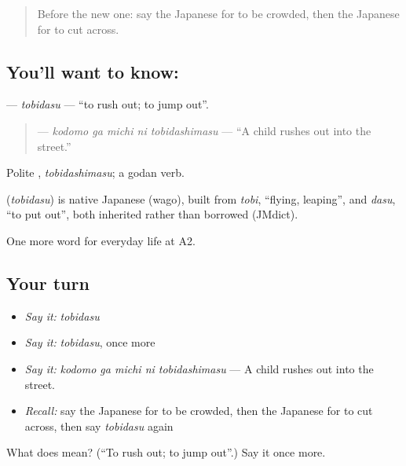 \begin{quote}
Before the new one: say the Japanese for to be crowded, then the Japanese for to cut across.
\end{quote}

\subsection*{You'll want to know: }
\textbf{} — \emph{tobidasu} — \textquotedblleft{}to rush out; to jump out\textquotedblright{}.

\begin{quote}
\textbf{  } — \emph{kodomo ga michi ni tobidashimasu} — \textquotedblleft{}A child rushes out into the street.\textquotedblright{}
\end{quote}

Polite \textbf{}, \emph{tobidashimasu}; a godan verb.

\begin{cousinweb}
\textbf{} (\emph{tobidasu}) is native Japanese (wago), built from \emph{tobi}, \textquotedblleft{}flying, leaping\textquotedblright{}, and \emph{dasu}, \textquotedblleft{}to put out\textquotedblright{}, both inherited rather than borrowed (JMdict).
\end{cousinweb}

\begin{grammarlens}[title={What you've built}]
One more word for everyday life at A2.
\end{grammarlens}

\subsection*{Your turn}
\begin{itemize}
\raggedright
  \item \emph{Say it:} \emph{tobidasu}
  \item \emph{Say it:} \emph{tobidasu}, once more
  \item \emph{Say it:} \emph{kodomo ga michi ni tobidashimasu} — A child rushes out into the street.
  \item \emph{Recall:} say the Japanese for to be crowded, then the Japanese for to cut across, then say \emph{tobidasu} again
\end{itemize}

\begin{tcolorbox}[breakable,colback=teal!4,colframe=teal!35!black,title={Before you move on}]
What does  mean? (\textquotedblleft{}To rush out; to jump out\textquotedblright{}.) Say it once more.
\end{tcolorbox}
